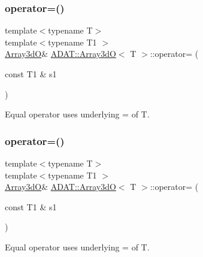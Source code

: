 \mbox{\label{classADAT_1_1Array3dO_a7f1b73e1e34cf1e21dfac8af86469ee1}} 
\subsubsection{\texorpdfstring{operator=()}{operator=()}\hspace{0.1cm}{\footnotesize\ttfamily [3/4]}}
{\footnotesize\ttfamily template$<$typename T$>$ \\
template$<$typename T1 $>$ \\
\mbox{\hyperlink{classADAT_1_1Array3dO}{Array3dO}}\& \mbox{\hyperlink{classADAT_1_1Array3dO}{A\+D\+A\+T\+::\+Array3dO}}$<$ T $>$\+::operator= (\begin{DoxyParamCaption}\item[{const T1 \&}]{s1 }\end{DoxyParamCaption})\hspace{0.3cm}{\ttfamily [inline]}}



Equal operator uses underlying = of T. 

\mbox{\label{classADAT_1_1Array3dO_a7f1b73e1e34cf1e21dfac8af86469ee1}} 
\subsubsection{\texorpdfstring{operator=()}{operator=()}\hspace{0.1cm}{\footnotesize\ttfamily [4/4]}}
{\footnotesize\ttfamily template$<$typename T$>$ \\
template$<$typename T1 $>$ \\
\mbox{\hyperlink{classADAT_1_1Array3dO}{Array3dO}}\& \mbox{\hyperlink{classADAT_1_1Array3dO}{A\+D\+A\+T\+::\+Array3dO}}$<$ T $>$\+::operator= (\begin{DoxyParamCaption}\item[{const T1 \&}]{s1 }\end{DoxyParamCaption})\hspace{0.3cm}{\ttfamily [inline]}}



Equal operator uses underlying = of T. 

